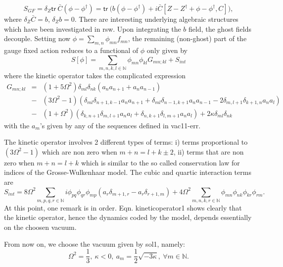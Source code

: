 \documentclass[10pt]{book}
\newcommand{\tr}{\mathsf{tr}}
\theoremstyle{break}
\begin{document}
\begin{equation*}
S_{GF}=\delta_Z\tr\ {\bar{C}}(\phi-\phi^\dag)=\tr\ \bigg( b(\phi-\phi^\dag)+i{\bar{C}}[Z-Z^\dag+\phi-\phi^\dag,C]\bigg),
\end{equation*}
where $\delta_Z{\bar{C}}=b$, $\delta_Zb=0$. There are interesting underlying algebraic structures which have been investigated in {rsw}. Upon integrating the $b$ field, the ghost fields decouple. Setting now $\phi=\sum_{m,n}\phi_{mn}f_{mn}$, the remaining (non-ghost) part of the gauge fixed action reduces to a functional of $\phi$ only given by
\begin{equation*}
S[\phi]=\sum_{m,n,k,l\in\mathbb{N}} \phi_{mn}\phi_{kl}G_{mn;kl}+S_{int}
\end{equation*}
where the kinetic operator takes the complicated expression
\begin{eqnarray*}
G_{mn;kl} &=&(1+5\Omega^2)\delta_{ml}\delta_{nk}(a_na_{n+1}+a_na_{n-1})\nonumber\\
&-&(3\Omega^2-1)(\delta_{ml}\delta_{n+1,k-1}a_na_{n+1}+\delta_{ml}\delta_{n-1,k+1}a_na_{n-1}
-2\delta_{m,l+1}\delta_{k+1,n}a_na_l)\nonumber \\
&-&(1+\Omega^2)(\delta_{k,n+1}\delta_{m,l+1}a_na_l+\delta_{n,k+1}\delta_{l,m+1}a_na_l)+2\kappa\delta_{ml}\delta_{nk}
\end{eqnarray*}
with the $a_m$'s given by any of the sequences defined in {vac11}-{err}. \par
The kinetic operator involves 2 different types of terms: i) terms proportional to $(3\Omega^2-1)$ which are non zero when $m+n=l+k\pm2$, ii) terms that are non zero when $m+n=l+k$ which is similar to the so called conservation law for indices of the Grosse-Wulkenhaar model. The cubic and quartic interaction terms are
\begin{equation*}
S_{int}=8\Omega^2\sum_{m,p,q,r\in\mathbb{N}}i\phi_{pq}\phi_{qr}\phi_{mp}(a_r\delta_{m+1,r}-a_r\delta_{r+1,m})+
4\Omega^2\sum_{m,n,k,r\in\mathbb{N}}\phi_{mn}\phi_{nk}\phi_{kr}\phi_{rm}.
\end{equation*}
At this point, one remark is in order. Eqn. {kineticoperator1} shows clearly that the kinetic operator, hence the dynamics coded by the model, depends essentially on the choosen vacuum.\par
From now on, we choose the vacuum given by {sol1}, namely: 
\begin{equation*}
\Omega^2={\frac{1}{3}},\ \kappa<0,\ a_m={\frac12}{\sqrt{ -3\kappa}},\ \forall m\in\mathbb{N}\nonumber.
\end{equation*}
\end{document}

